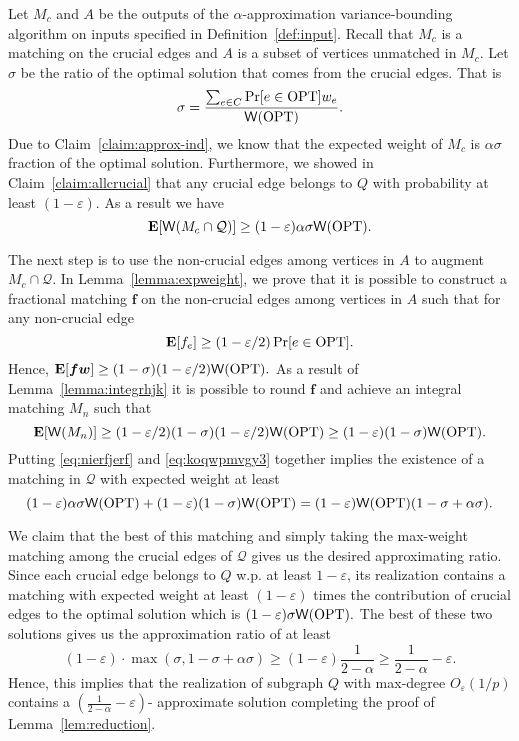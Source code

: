 \documentclass[letterpaper,11pt]{article}
\renewcommand{\epsilon}{\varepsilon}
\DeclareMathOperator{\E}{\ensuremath{\normalfont \textbf{E}}}
\newcommand{\mc}[1]{\ensuremath{\mathcal{#1}}}
\newcommand{\opt}[0]{\text{OPT}}
\newcommand{\weight}[0]{{\sf{W}}}
\renewcommand{\epsilon}[0]{\ensuremath{\varepsilon}}
\renewcommand{\mc}[1]{\ensuremath{\mathcal{#1}}}
\begin{document}
Let $M_c$ and $A$ be the outputs of the $\alpha$-approximation variance-bounding algorithm on inputs specified in Definition~\ref{def:input}. Recall that $M_c$ is a matching on the crucial edges and $A$ is a subset of vertices unmatched in $M_c$. Let $\sigma$ be the ratio of the optimal solution that comes from the crucial edges. That is
$$\sigma=\frac{\sum_{e\in C} \Pr[e\in \opt] w_e}{\weight(\opt) }.$$
Due to Claim~\ref{claim:approx-ind}, we know that the expected weight of $M_c$ is $\alpha\sigma$ fraction of the optimal solution. Furthermore, we showed in Claim~\ref{claim:allcrucial} that any crucial edge belongs to $Q$ with probability at least $(1-\epsilon)$. As a result we have \begin{equation}\label{eq:nierfjerf}
    \E[\weight(M_c\cap \mc{Q})]\geq (1-\epsilon)\alpha\sigma\weight(\opt).
\end{equation}

The next step is to use the non-crucial edges among vertices in $A$ to augment $M_c\cap \mc{Q}$. In Lemma~\ref{lemma:expweight}, we prove that it is possible to construct a fractional matching $\bm{f}$ on the non-crucial edges among vertices in $A$ such that for any non-crucial edge $$\E[f_e]\geq (1-\epsilon/2)\Pr[e\in \opt].$$ Hence, $\E[\bm{f}\bm{w}]\geq (1-\sigma) (1-\epsilon/2)\weight(\opt).$ As a result of Lemma~\ref{lemma:integrhjk} it is possible to round $\bm{f}$  and achieve an integral matching $M_n$ such that
\begin{equation}\label{eq:koqwpmvgy3}
   \E[\weight(M_n)]\geq (1-\epsilon/2)(1-\sigma) (1-\epsilon/2)\weight(\opt)\geq (1-\epsilon)(1-\sigma)\weight(\opt).
\end{equation}
Putting \cref{eq:nierfjerf} and \cref{eq:koqwpmvgy3} together implies the existence of a matching in $\mc{Q}$ with expected weight at least
$$(1-\epsilon)\alpha\sigma\weight(\opt)+ (1-\epsilon)(1-\sigma)\weight(\opt)  = (1-\epsilon)\weight(\opt)(1-\sigma+\alpha\sigma).$$

We claim that the best of this matching  and simply taking the max-weight matching among the crucial edges of $\mc{Q}$ gives us the desired approximating ratio. Since each crucial edge belongs to $Q$ w.p. at least $1-\epsilon$, its realization contains a matching with expected weight at least $(1-\epsilon)$ times the contribution of crucial edges to the optimal solution which is $(1-\epsilon)\sigma\weight(\opt).$ The best of these two solutions gives us the approximation ratio of at least $$(1-\epsilon)\cdot\max(\sigma, 1-\sigma+\alpha\sigma)\geq (1-\epsilon)\frac{1}{2-\alpha}\geq \frac{1}{2-\alpha}-\epsilon.$$
Hence, this implies that the realization of subgraph $Q$ with max-degree $O_{\epsilon}(1/p)$ contains a $(\frac{1}{2-\alpha}-\epsilon)$- approximate solution completing the proof of Lemma~\ref{lem:reduction}. 
\end{document}
